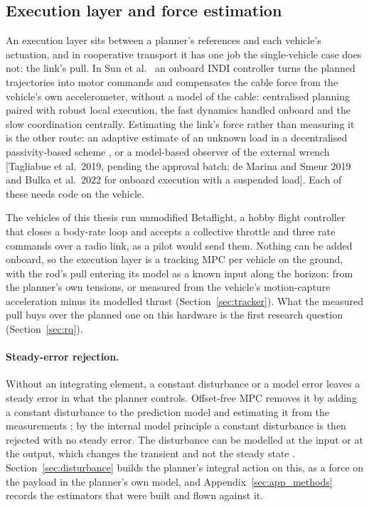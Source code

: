 
\subsection{Execution layer and force estimation}
\label{sec:lit_execution}

An execution layer sits between a planner's references and each vehicle's actuation, and in cooperative transport
it has one job the single-vehicle case does not: the link's pull. In Sun et al.\ \cite{tudelft} an onboard INDI
controller \cite{smeur2016indi} turns the planned trajectories into motor commands and compensates the cable force
from the vehicle's own accelerometer, without a model of the cable: centralised planning paired with robust
local execution, the fast dynamics handled onboard and the slow coordination centrally. Estimating the link's
force rather than measuring it is the other route: an adaptive estimate of an unknown load in a decentralised
passivity-based scheme \cite{klausen2020cooperative}, or a model-based observer of the external wrench
[Tagliabue et al.\ 2019, pending the approval batch; de Marina and Smeur 2019 and Bulka et al.\ 2022 for
onboard execution with a suspended load]. Each of these needs code on the vehicle.

The vehicles of this thesis run unmodified Betaflight, a hobby flight controller that closes a body-rate loop and
accepts a collective throttle and three rate commands over a radio link, as a pilot would send them. Nothing can
be added onboard, so the execution layer is a tracking MPC per vehicle on the ground, with the rod's pull entering
its model as a known input along the horizon: from the planner's own tensions, or measured from the vehicle's
motion-capture acceleration minus its modelled thrust (Section~\ref{sec:tracker}). What the measured pull buys
over the planned one on this hardware is the first research question (Section~\ref{sec:rq}).

\paragraph{Steady-error rejection.} Without an integrating element, a constant disturbance or a model error
leaves a steady error in what the planner controls. Offset-free MPC removes it by adding a constant disturbance
to the prediction model and estimating it from the measurements \cite{muske2002disturbance,
pannocchia2003disturbance, maeder2009linear}; by the internal model principle \cite{francis1976internal} a
constant disturbance is then rejected with no steady error. The disturbance can be modelled at the input or at
the output, which changes the transient and not the steady state \cite{pannocchia2007combined}.
Section~\ref{sec:disturbance} builds the planner's integral action on this, as a force on the payload in the
planner's own model, and Appendix~\ref{sec:app_methods} records the estimators that were built and flown against
it.
